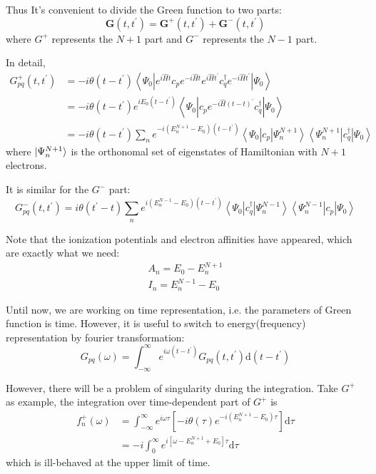 \documentclass[bachelor, english]{ustcthesis}
\begin{document}
Thus It's convenient to divide the Green function to two parts:
$$
\boldsymbol{G}\left(t, t^{\prime}\right)=\boldsymbol{G}^{+}\left(t, t^{\prime}\right)+\boldsymbol{G}^{-}\left(t, t^{\prime}\right)
$$
where $G^{+}$ represents the $N+1$ part and $G^{-}$ represents the $N-1$ part.

In detail,
$$
\begin{aligned}
	G_{p q}^{+}\left(t, t^{\prime}\right) 
	&=-i \theta\left(t-t^{\prime}\right)\left\langle\Psi_{0}\left|e^{i \hat{H} t} c_{p} e^{-i \hat{H} t} e^{i \hat{H} t^{\prime}} c_{q}^{\dagger} e^{-i \hat{H} t^{\prime}}\right| \Psi_{0}\right\rangle
	\\
	&=- i \theta\left(t-t^{\prime}\right) e^{i E_{0}\left(t-t^{\prime}\right)}\left\langle\Psi_{0}\left|c_{p} e^{-i \hat{H}(t-t)^{\prime}} c_{q}^{\dagger}\right| \Psi_{0}\right\rangle
	\\
	&=-i \theta\left(t-t^{\prime}\right) \sum_{n} e^{-i\left(E_{n}^{N+1}-E_{0}\right)\left(t-t^{\prime}\right)}\left\langle\Psi_{0}\left|c_{p}\right| \Psi_{n}^{N+1}\right\rangle\left\langle\Psi_{n}^{N+1}\left|c_{q}^{\dagger}\right| \Psi_{0}\right\rangle
\end{aligned}
$$
where $\ket{\Psi_n^{N+1}}$ is the orthonomal set of eigenstates of Hamiltonian with $N+1$ electrons.

It is similar for the $G^{-}$ part:
$$
G_{p q}^{-}\left(t, t^{\prime}\right)=i \theta\left(t^{\prime}-t\right) \sum_{n} e^{i\left(E_{n}^{N-1}-E_{0}\right)\left(t-t^{\prime}\right)}\left\langle\Psi_{0}\left|c_{q}^{\dagger}\right| \Psi_{n}^{N-1}\right\rangle\left\langle\Psi_{n}^{N-1}\left|c_{p}\right| \Psi_{0}\right\rangle
$$

Note that the ionization potentials and electron affinities have appeared, which are exactly what we need:
$$
\begin{array}{l}{A_{n}=E_{0}-E_{n}^{N+1}} \\ {I_{n}=E_{n}^{N-1}-E_{0}}\end{array}
$$

Until now, we are working on time representation, i.e. the parameters of Green function is time.
However, it is useful to switch to energy(frequency) representation by fourier transformation:
$$
G_{p q}(\omega)=\int_{-\infty}^{\infty} e^{i \omega\left(t-t^{\prime}\right)} G_{p q}\left(t, t^{\prime}\right) \mathrm{d}\left(t-t^{\prime}\right)
$$

However, there will be a problem of singularity during the integration.
Take $G^{+}$ as example, the integration over time-dependent part of $G^{+}$ is
$$
\begin{aligned} f_{n}^{+}(\omega) &=\int_{-\infty}^{\infty} e^{i \omega \tau}\left[-i \theta(\tau) e^{-i\left(E_{n}^{N+1}-E_{0}\right) \tau}\right] \mathrm{d} \tau \\ &=-i \int_{0}^{\infty} e^{i\left[\omega-E_{n}^{N+1}+E_{0}\right] \tau} \mathrm{d} \tau \end{aligned}
$$
which is ill-behaved at the upper limit of time.
\end{document}
